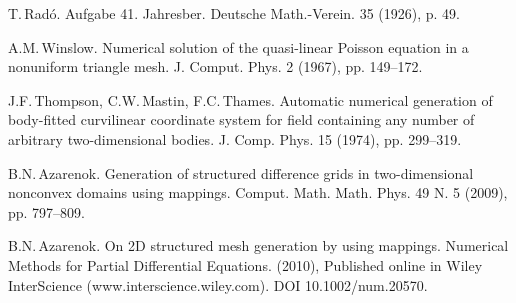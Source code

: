 
\begin{thebibliography}{10}
{\sc T.\,Rad\'o}. {Aufgabe 41}. Jahresber. Deutsche Math.-Verein. 35 (1926), p. 49.

{\sc A.M.\,Winslow}. {Numerical solution of the quasi-linear Poisson equation in a nonuniform triangle mesh}. J. Comput. Phys. 2 (1967), pp. 149--172.

{\sc J.F.\,Thompson, C.W.\,Mastin, F.C.\,Thames}. {Automatic numerical generation of body-fitted curvilinear coordinate system for field containing any
number of arbitrary two-dimensional bodies}. J. Comp. Phys. 15 (1974), pp. 299--319.

{\sc B.N.\,Azarenok}. {Generation of structured difference grids in two-dimensional nonconvex domains using mappings}. Comput. Math. Math. Phys. 49 N. 5 (2009), pp. 797--809.

{\sc B.N.\,Azarenok}. {On 2D structured mesh generation by using mappings}. Numerical Methods for Partial Differential Equations. (2010), Published online in Wiley InterScience (www.interscience.wiley.com). DOI 10.1002/num.20570.
\end{thebibliography}